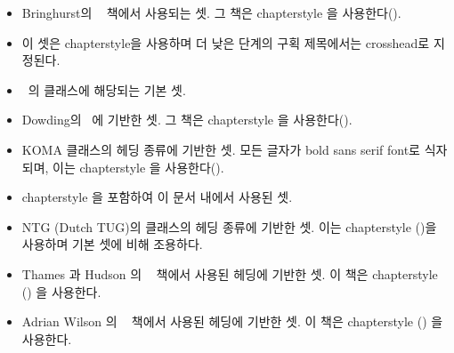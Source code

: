 \begin{itemize}
	\item[\hstyle{bringhurst}] Bringhurst의 ~\cite{BRINGHURST99} 책에서 사용되는 셋.
		그 책은  chapterstyle 을 사용한다().
	\item[\hstyle{crosshead}] 이 셋은  chapterstyle을 사용하며
	더 낮은 단계의 구획 제목에서는 crosshead로 지정된다.
	\item[\hstyle{default}] \ltx\ 의
	 클래스에 해당되는 기본 셋.
	\item[\hstyle{dowding}] Dowding의
	~\cite{DOWDING96}에 기반한 셋. 그 책은  
	chapterstyle 을 사용한다().
	\item[\hstyle{komalike}] KOMA  클래스의 헤딩 종류에 기반한 셋.
	모든 글자가 bold sans serif font로 식자되며, 
	이는   chapterstyle 을 사용한다().
	\item[\hstyle{memman}]  chapterstyle 을 포함하여 이 문서 내에서 사용된 셋.
	\item[\hstyle{ntglike}] NTG (Dutch TUG)의  클래스의 헤딩 종류에 기반한 셋. 
	이는 
	chapterstyle ()을 사용하며 기본 셋에 비해 조용하다.
	\item[\hstyle{tandh}] Thames 과 Hudson 의
	~\cite{MCLEAN80} 책에서 사용된 헤딩에 기반한 셋.
	이 책은 
	chapterstyle () 을 사용한다.
	\item[\hstyle{wilsondob}] Adrian Wilson 의
	~\cite{ADRIANWILSON93} 책에서 사용된 헤딩에 기반한 셋. 
	이 책은 
	chapterstyle () 을 사용한다.
	
\end{itemize}



